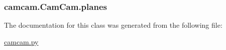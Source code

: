 \subsubsection[{planes}]{\setlength{\rightskip}{0pt plus 5cm}camcam.\+Cam\+Cam.\+planes}\label{classcamcam_1_1_cam_cam_af7e60c4dabd6dcfab7ca2d31e070c2c2}


The documentation for this class was generated from the following file\+:\begin{DoxyCompactItemize}
\item 
\hyperlink{camcam_8py}{camcam.\+py}\end{DoxyCompactItemize}
